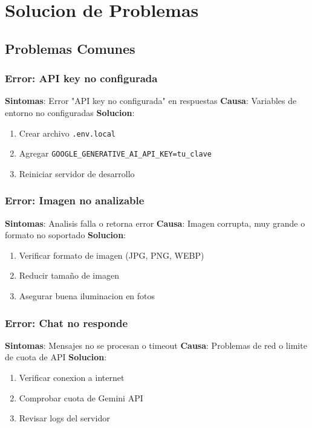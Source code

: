 \documentclass[12pt,a4paper]{article}
\begin{document}
\section{Solucion de Problemas}

\subsection{Problemas Comunes}

\subsubsection{Error: API key no configurada}

\textbf{Sintomas}: Error "API key no configurada" en respuestas
\textbf{Causa}: Variables de entorno no configuradas
\textbf{Solucion}: 
\begin{enumerate}
    \item Crear archivo \texttt{.env.local}
    \item Agregar \texttt{GOOGLE_GENERATIVE_AI_API_KEY=tu\_clave}
    \item Reiniciar servidor de desarrollo
\end{enumerate}

\subsubsection{Error: Imagen no analizable}

\textbf{Sintomas}: Analisis falla o retorna error
\textbf{Causa}: Imagen corrupta, muy grande o formato no soportado
\textbf{Solucion}: 
\begin{enumerate}
    \item Verificar formato de imagen (JPG, PNG, WEBP)
    \item Reducir tamaño de imagen
    \item Asegurar buena iluminacion en fotos
\end{enumerate}

\subsubsection{Error: Chat no responde}

\textbf{Sintomas}: Mensajes no se procesan o timeout
\textbf{Causa}: Problemas de red o limite de cuota de API
\textbf{Solucion}: 
\begin{enumerate}
    \item Verificar conexion a internet
    \item Comprobar cuota de Gemini API
    \item Revisar logs del servidor
\end{enumerate}
\end{document}
